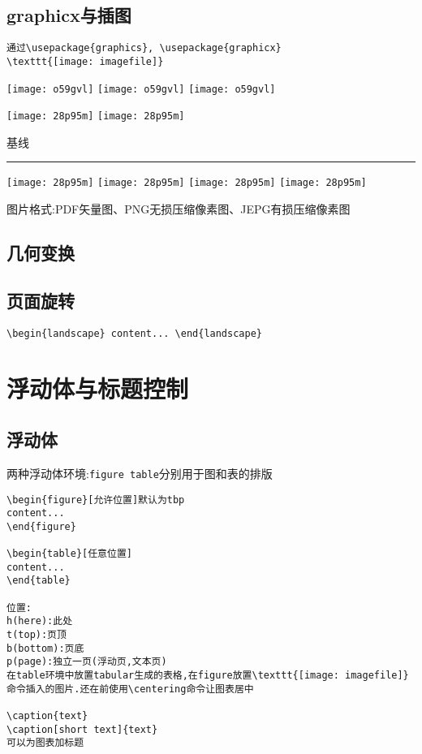 \documentclass[a4paper, titlepage, hyperref, UTF8]{ctexart}
\begin{document}
\subsection{graphicx与插图}
\begin{verbatim}
通过\usepackage{graphics}, \usepackage{graphicx}
\texttt{[image: imagefile]}
\end{verbatim}

\texttt{[image: o59gvl]}
\texttt{[image: o59gvl]}
\texttt{[image: o59gvl]}

\texttt{[image: 28p95m]}
\texttt{[image: 28p95m]}

基线\rule{2cm}{0.4pt}
\texttt{[image: 28p95m]}
\texttt{[image: 28p95m]}
\texttt{[image: 28p95m]}
\texttt{[image: 28p95m]}

图片格式:PDF矢量图、PNG无损压缩像素图、JEPG有损压缩像素图





\subsection{几何变换}
\subsection{页面旋转}
\verb|\begin{landscape} content... \end{landscape}|




\section{浮动体与标题控制}
\subsection{浮动体}
两种浮动体环境:\verb|figure table|分别用于图和表的排版
\begin{verbatim}
\begin{figure}[允许位置]默认为tbp
content...
\end{figure}

\begin{table}[任意位置]
content...
\end{table}

位置:
h(here):此处
t(top):页顶
b(bottom):页底
p(page):独立一页(浮动页,文本页)
在table环境中放置tabular生成的表格,在figure放置\texttt{[image: imagefile]}
命令插入的图片.还在前使用\centering命令让图表居中

\caption{text}
\caption[short text]{text}
可以为图表加标题
\end{verbatim}
\end{document}
